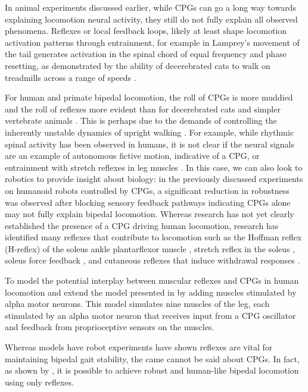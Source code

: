 In animal experiments discussed earlier, while CPGs can go a long way towards
explaining locomotion neural activity, they still do not fully explain all
observed phenomena. Reflexes or local feedback loops, likely at least shape
locomotion activation patterns through entrainment, for example in Lamprey's
movement of the tail generates activation in the spinal chord of equal frequency
\citep{mcclellan1993mechanosensory} and phase resetting, as demonstrated by the
ability of decerebrated cats to walk on treadmills across a range of speeds
\citep{rossignol2000locomotion}.

For human and primate bipedal locomotion, the roll of CPGs is more muddied and
the roll of reflexes more evident than for decerebrated cats and simpler
vertebrate animals \citep{mackay2002central, vaughan2003theories,
nielsen2003we}. This is perhaps due to the demands of controlling the inherently
unstable dynamics of upright walking \citep{capaday2002special}. For example,
while rhythmic spinal activity has been observed in humans, it is not clear if
the neural signals are an example of autonomous fictive motion, indicative of a
CPG, or entrainment with stretch reflexes in leg muscles
\citep{capaday2002special, stewart1991modulation}. In this case, we can also
look to robotics to provide insight about biology: in the previously discussed
experiments on humanoid robots controlled by CPGs, a significant reduction in
robustness was observed after blocking sensory feedback pathways
\citep{endo2005experimental, righetti2006programmable} indicating CPGs alone may
not fully explain bipedal locomotion. Whereas research has not yet clearly
established the presence of a CPG driving human locomotion, research has
identified many reflexes that contribute to locomotion such as the Hoffman
reflex (H-reflex) of the soleus ankle plantarflexor muscle
\citep{capaday1987difference}, stretch reflex in the soleus
\citep{yang1991contribution}, soleus force feedback \citep{grey2007positive},
and cutaneous reflexes that induce withdrawal responses \citep{yang1990phase}. 

To model the potential interplay between muscular reflexes and CPGs in human
locomotion \citet{ogihara2001generation} and extend the model presented in
\citet{taga1991self} by adding muscles stimulated by alpha motor neurons.  This
model simulates nine muscles of the leg, each stimulated by an alpha motor
neuron that receives input from a CPG oscillator and feedback from
proprioceptive sensors on the muscles.

Whereas models have robot experiments have shown reflexes are vital for
maintaining bipedal gait stability, the came cannot be said about CPGs. In fact,
as shown by \citet{}, it is possible to achieve robust and human-like bipedal
locomotion using only reflexes.

